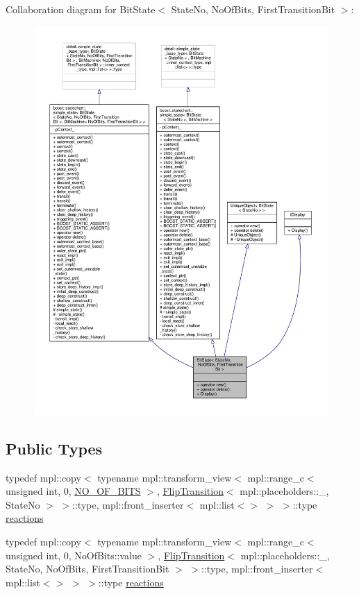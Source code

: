 Collaboration diagram for Bit\+State$<$ State\+No, No\+Of\+Bits, First\+Transition\+Bit $>$\+:
\nopagebreak
\begin{figure}[H]
\begin{center}
\leavevmode
\includegraphics[width=350pt]{struct_bit_state__coll__graph}
\end{center}
\end{figure}
\subsection*{Public Types}
\begin{DoxyCompactItemize}
\item 
typedef mpl\+::copy$<$ typename mpl\+::transform\+\_\+view$<$ mpl\+::range\+\_\+c$<$ unsigned int, 0, \mbox{\hyperlink{_bit_machine_8cpp_ac894b74325002b036bfc596bd5434f89}{N\+O\+\_\+\+O\+F\+\_\+\+B\+I\+TS}} $>$, \mbox{\hyperlink{struct_flip_transition}{Flip\+Transition}}$<$ mpl\+::placeholders\+::\+\_\+, State\+No $>$ $>$\+::type, mpl\+::front\+\_\+inserter$<$ mpl\+::list$<$$>$ $>$ $>$\+::type \mbox{\hyperlink{struct_bit_state_a59bd125c7d205880081926b1a6d7689a}{reactions}}
\item 
typedef mpl\+::copy$<$ typename mpl\+::transform\+\_\+view$<$ mpl\+::range\+\_\+c$<$ unsigned int, 0, No\+Of\+Bits\+::value $>$, \mbox{\hyperlink{struct_flip_transition}{Flip\+Transition}}$<$ mpl\+::placeholders\+::\+\_\+, State\+No, No\+Of\+Bits, First\+Transition\+Bit $>$ $>$\+::type, mpl\+::front\+\_\+inserter$<$ mpl\+::list$<$$>$ $>$ $>$\+::type \mbox{\hyperlink{struct_bit_state_a409080fdeaba7f3ec0b63f44bc683d92}{reactions}}
\end{DoxyCompactItemize}
